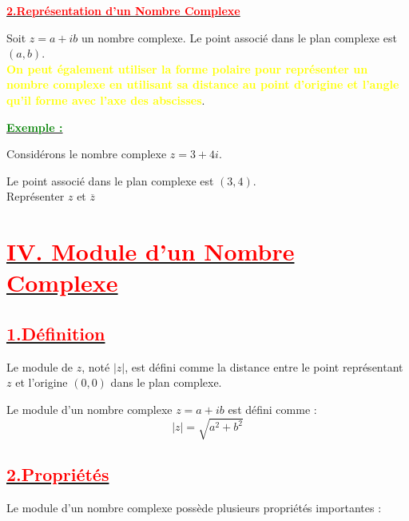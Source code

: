 \documentclass[12pt]{article}
\newcounter{exemple} %
\newcommand{\exemple}{%
  \refstepcounter{exemple}%
  \textbf{\textcolor{green}{Exemple \theexemple :}} \ignorespaces
}
\begin{document}
\underline{\textbf{\textcolor{red}{2.Représentation d'un Nombre Complexe}}}

Soit $z = a + ib$ un nombre complexe. Le point associé dans le plan complexe est $(a, b)$.\\
\textbf{\textcolor{yellow}{On peut également utiliser la forme polaire pour représenter un nombre complexe en utilisant sa distance au point d'origine et l'angle qu'il forme avec l'axe des abscisses}}.

\underline{\exemple}

Considérons le nombre complexe $z = 3 + 4i$. 

Le point associé dans le plan complexe est $(3, 4)$.\\
Représenter $z$ et $\overline{z}$\\


\section*{\underline{\textbf{\textcolor{red}{IV. Module d'un Nombre Complexe}}}}
\subsection*{\underline{\textbf{\textcolor{red}{1.Définition  }}}} 
Le module de $z$, noté $|z|$, est défini comme la distance entre le point représentant $z$ et l'origine $(0,0)$ dans le plan complexe.

Le module d'un nombre complexe $z = a + ib$ est défini comme :
\[ |z| = \sqrt{a^2 + b^2} \]

\subsection*{\underline{\textbf{\textcolor{red}{2.Propriétés}}}}

Le module d'un nombre complexe possède plusieurs propriétés importantes :
\end{document}
